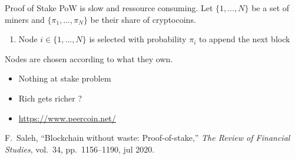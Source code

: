 \documentclass{beamer}
\begin{document}
\begin{frame}{Proof of Stake}
PoW is slow and ressource consuming. Let $\{1,\ldots, N\}$ be a set of miners and $\{\pi_1,\ldots, \pi_N\}$ be their share of cryptocoins.
\begin{tcolorbox}[enhanced,drop shadow, title=PoS]
\begin{enumerate}
\item Node $i\in \{1,\ldots, N\}$ is selected with probability $\pi_i$ to append the next block
\end{enumerate}
\end{tcolorbox}
\vspace{0.3cm}
Nodes are chosen according to what they own.
\begin{itemize}
  \item Nothing at stake problem
  \item Rich gets richer ? 
  \item \url{https://www.peercoin.net/}
\end{itemize}
\footnotesize{
\begin{thebibliography}{1}
F.~Saleh, ``Blockchain without waste: Proof-of-stake,'' {\em The Review of
  Financial Studies}, vol.~34, pp.~1156--1190, jul 2020.
\end{thebibliography}}
\end{frame}



\end{document}
